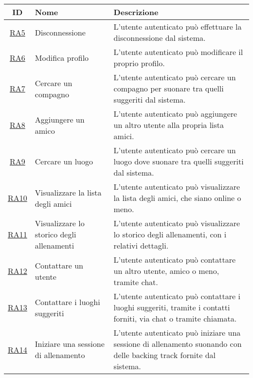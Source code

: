 \documentclass[12pt, a4paper]{article}
\begin{document}
\begin{longtable}{|c|p{5cm}|p{7cm}|}
    \hline \textbf{ID}            & \textbf{Nome}                               & \textbf{Descrizione}                                                                                                \\  \hline
    \hline \hyperlink{RA5}{RA5}   & Disconnessione                              & L'utente autenticato può effettuare la disconnessione dal sistema.                                                  \\ \hline
    \hline \hyperlink{RA6}{RA6}   & Modifica profilo                            & L'utente autenticato può modificare il proprio profilo.                                                             \\ \hline
    \hline \hyperlink{RA7}{RA7}   & Cercare un compagno                         & L'utente autenticato può cercare un compagno per suonare tra quelli suggeriti dal sistema.                          \\ \hline
    \hline \hyperlink{RA8}{RA8}   & Aggiungere un amico                         & L'utente autenticato può aggiungere un altro utente alla propria lista amici.                                       \\ \hline
    \hline \hyperlink{RA9}{RA9}   & Cercare un luogo                            & L'utente autenticato può cercare un luogo dove suonare tra quelli suggeriti dal sistema.                            \\ \hline
    \hline \hyperlink{RA10}{RA10} & Visualizzare la lista degli amici           & L'utente autenticato può visualizzare la lista degli amici, che siano online o meno.                                \\ \hline
    \hline \hyperlink{RA11}{RA11} & Visualizzare lo storico degli allenamenti   & L'utente autenticato può visualizzare lo storico degli allenamenti, con i relativi dettagli.                        \\ \hline
    \hline \hyperlink{RA12}{RA12} & Contattare un utente                        & L'utente autenticato può contattare un altro utente, amico o meno, tramite chat.                                    \\ \hline
    \hline \hyperlink{RA13}{RA13} & Contattare i luoghi suggeriti               & L'utente autenticato può contattare i luoghi suggeriti, tramite i contatti forniti, via chat o tramite chiamata.    \\ \hline
    \hline \hyperlink{RA14}{RA14} & Iniziare una sessione di allenamento        & L'utente autenticato può iniziare una sessione di allenamento suonando con delle backing track fornite dal sistema. \\ \hline

\end{longtable}
\end{document}
